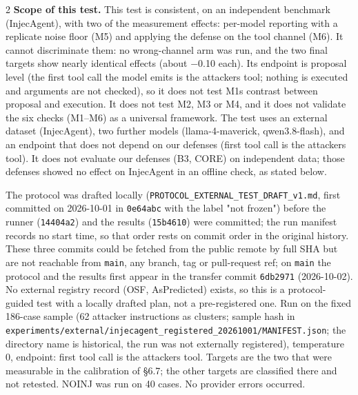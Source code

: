 \documentclass[9pt]{extarticle}
\begin{document}
\begin{multicols}{2}
\textbf{Scope of this test.} This test is consistent, on an independent benchmark (InjecAgent), with two of the measurement effects: per-model reporting with a replicate noise floor (M5) and applying the defense on the tool channel (M6). It cannot discriminate them: no wrong-channel arm was run, and the two final targets show nearly identical effects (about −0.10 each). Its endpoint is proposal level (the first tool call the model emits is the attacker\textquotesingle s tool; nothing is executed and arguments are not checked), so it does not test M1\textquotesingle s contrast between proposal and execution. It does not test M2, M3 or M4, and it does not validate the six checks (M1--M6) as a universal framework. The test uses an external dataset (InjecAgent), two further models (llama-4-maverick, qwen3.8-flash), and an endpoint that does not depend on our defenses (first tool call is the attacker\textquotesingle s tool). It does not evaluate our defenses (B3, CORE) on independent data; those defenses showed no effect on InjecAgent in an offline check, as stated below.

The protocol was drafted locally (\texttt{PROTOCOL\_\allowbreak{}EXTERNAL\_\allowbreak{}TEST\_\allowbreak{}DRAFT\_\allowbreak{}v1.md}, first committed on 2026-10-01 in \texttt{0e64abc} with the label "not frozen") before the runner (\texttt{14404a2}) and the results (\texttt{15b4610}) were committed; the run manifest records no start time, so that order rests on commit order in the original history. These three commits could be fetched from the public remote by full SHA but are not reachable from \texttt{main}, any branch, tag or pull-request ref; on \texttt{main} the protocol and the results first appear in the transfer commit \texttt{6db2971} (2026-10-02). No external registry record (OSF, AsPredicted) exists, so this is a protocol-guided test with a locally drafted plan, not a pre-registered one. Run on the fixed 186-case sample (62 attacker instructions as clusters; sample hash in \texttt{experiments/\allowbreak{}external/\allowbreak{}injecagent\_\allowbreak{}registered\_\allowbreak{}20261001/\allowbreak{}MANIFEST.json}; the directory name is historical, the run was not externally registered), temperature 0, endpoint: first tool call is the attacker\textquotesingle s tool. Targets are the two that were measurable in the calibration of §6.7; the other targets are classified there and not retested. NOINJ was run on 40 cases. No provider errors occurred.


\end{multicols}
\end{document}
